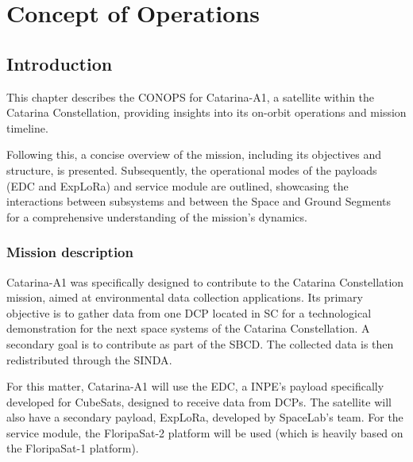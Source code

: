 %
%
%
%
%

%
%
%
%
%

\chapter{Concept of Operations} \label{ch:conops}

\section{Introduction}

This chapter describes the \ac{CONOPS} for Catarina-A1, a satellite within the Catarina Constellation, providing insights into its on-orbit operations and mission timeline.

Following this, a concise overview of the mission, including its objectives and structure, is presented. Subsequently, the operational modes of the payloads (\ac{EDC} and ExpLoRa) and service module are outlined, showcasing the interactions between subsystems and between the Space and Ground Segments for a comprehensive understanding of the mission's dynamics.

\subsection{Mission description}

Catarina-A1 was specifically designed to contribute to the Catarina Constellation mission, aimed at environmental data collection applications. Its primary objective is to gather data from one \ac{DCP} located in SC for a technological demonstration for the next space systems of the Catarina Constellation. A secondary goal is to contribute as part of the \ac{SBCD}. The collected data is then redistributed through the \ac{SINDA}.

For this matter, Catarina-A1 will use the \ac{EDC}, a \ac{INPE}'s payload specifically developed for CubeSats, designed to receive data from \acp{DCP}. The satellite will also have a secondary payload, ExpLoRa, developed by SpaceLab's team. For the service module, the FloripaSat-2 platform will be used (which is heavily based on the FloripaSat-1 platform).

